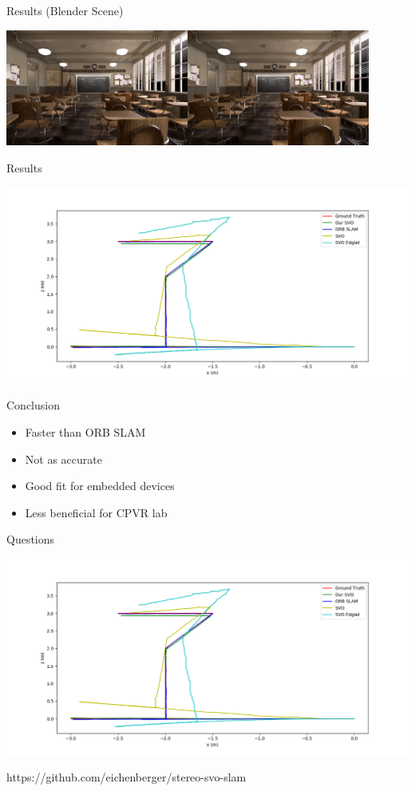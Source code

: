 \documentclass[aspectratio=169]{beamer}
\begin{document}
\begin{frame}{Results (Blender Scene)}
  \begin{center}
    \includegraphics[width=0.9\textwidth]{../img/blender_classroom_scene.png}
  \end{center}
\end{frame}

\begin{frame}{Results}
  \begin{center}
    \includegraphics[height=0.9\textheight]{../img/blender_classroom_simple_comp_top.png}
  \end{center}
\end{frame}

\begin{frame}{Conclusion}
  \begin{itemize}
    \item Faster than ORB SLAM
    \item Not as accurate
    \item Good fit for embedded devices
    \item Less beneficial for CPVR lab
  \end{itemize}
\end{frame}

\begin{frame}{Questions}
  \begin{center}
    \includegraphics[height=0.9\textheight]{../img/blender_classroom_simple_comp_top.png}
  \end{center}
  https://github.com/eichenberger/stereo-svo-slam
\end{frame}
\end{document}
